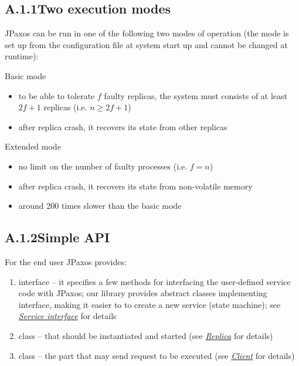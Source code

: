 \subsection*{A.1.1\quad Two execution modes}
\label{overview:two-execution-modes}
JPaxos can be run in one of the following two modes of operation
(the mode is set up from the configuration file at system start up
and cannot be changed at runtime):

Basic mode
\begin{itemize}
\item {} 
to be able to tolerate $f$ faulty replicas, the system must consists
of at least $2f + 1$ replicas (i.e. $n \ge 2f + 1$)

\item {} 
after replica crash, it recovers its state from other replicas

\end{itemize}

Extended mode
\begin{itemize}
\item {} 
no limit on the number of faulty processes (i.e. $f = n$)

\item {} 
after replica crash, it recovers its state from non-volatile memory

\item {} 
around 200 times slower than the basic mode

\end{itemize}


\subsection*{A.1.2\quad Simple API}
\label{overview:simple-api}
For the end user JPaxos provides:
\begin{enumerate}
\item {} 
 interface -- it specifies a few methods for interfacing
the user-defined servi\-ce code with JPaxos; our library provides
abstract classes implementing  interface, making it easier to
to create a new service (state machine);\linebreak
see {\hyperref[api:jpaxos-service]{\emph{Service interface}}} for details

\item {} 
 class -- that should be instantiated and started
(see {\hyperref[api:jpaxos-replica]{\emph{Replica}}} for details)

\item {} 
 class -- the part that may send request to be executed
(see {\hyperref[api:jpaxos-client]{\emph{Client}}} for details)

\end{enumerate}

